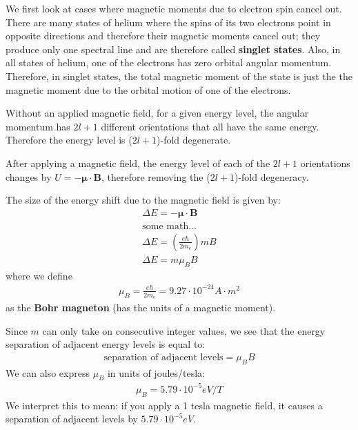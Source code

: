 \documentclass[10pt]{article}
\begin{document}
We first look at cases where magnetic moments due to electron spin cancel out. There are many states of helium where the spins of its two electrons point in opposite directions and therefore their magnetic moments cancel out; they produce only one spectral line and are therefore called \textbf{singlet states}. Also, in all states of helium, one of the electrons has zero orbital angular momentum. Therefore, in singlet states, the total magnetic moment of the state is just the
the magnetic moment due to the orbital motion of one of the electrons.

Without an applied magnetic field, for a given energy level, the angular momentum has $2l + 1$ different orientations that all have the same energy. Therefore the energy level is ($2l + 1$)-fold degenerate. 

After applying a magnetic field, the energy level of each of the $2l + 1$ orientations changes by $U = -\boldsymbol{\mu} \cdot \mathbf{B}$, therefore removing the ($2l + 1$)-fold degeneracy.

The size of the energy shift due to the magnetic field is given by: 
\begin{align}
    \Delta E = -\boldsymbol{\mu} \cdot \mathbf{B} \\
    \text{some math...} \\ 
    \Delta E = \left( \frac{e\hbar}{2m_e} \right) mB \\ 
    \Delta E = m \mu_B B
\end{align}
where we define
\begin{align}
    \mu_B = \frac{e\hbar}{2m_e} = 9.27 \cdot 10^{-24} A \cdot m^2
\end{align}
as the \textbf{Bohr magneton} (has the units of a magnetic moment).

Since $m$ can only take on consecutive integer values, we see that the energy separation of adjacent energy levels is equal to:
\begin{align}
    \text{separation of adjacent levels} = \mu_B B
\end{align}
We can also express $\mu_B$ in units of joules/tesla:
\begin{align}
    \mu_B = 5.79 \cdot 10^{-5} eV/T
\end{align}
We interpret this to mean: if you apply a 1 tesla magnetic field, it causes a separation of adjacent levels by $5.79 \cdot 10^{-5} eV$.
\end{document}
